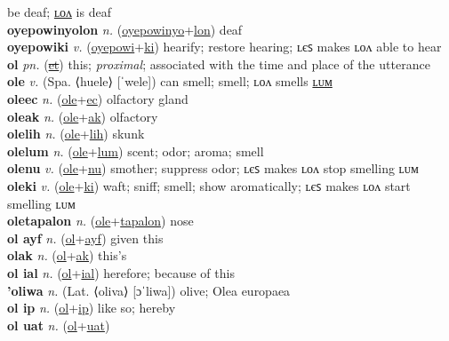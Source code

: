 be deaf; \hyperref[oyepowinyolon]{ʟᴏᴧ} is deaf \label{oyepowinyo} \\
\textbf{oyepowinyolon} \textit{n.} (\hyperref[oyepowinyo]{oyepowinyo}+\hyperref[lon]{lon})
deaf \label{oyepowinyolon} \\
\textbf{oyepowiki} \textit{v.} (\hyperref[oyepowi]{oyepowi}+\hyperref[ki]{ki})
hearify; restore hearing; ʟєꜱ makes ʟᴏᴧ able to hear \label{oyepowiki} \\
\textbf{ol} \textit{pn.} (\hyperref[et]{\sout{et}})
this; \textit{proximal}; associated with the time and place of the utterance \label{ol} \\
\textbf{ole} \textit{v.} (Spa. ⟨huele⟩ [ˈwele])
can smell; smell; ʟᴏᴧ smells \hyperref[olelum]{ʟᴜᴍ} \label{ole} \\
\textbf{oleec} \textit{n.} (\hyperref[ole]{ole}+\hyperref[ec]{ec})
olfactory gland \label{oleec} \\
\textbf{oleak} \textit{n.} (\hyperref[ole]{ole}+\hyperref[ak]{ak})
olfactory \label{oleak} \\
\textbf{olelih} \textit{n.} (\hyperref[ole]{ole}+\hyperref[lih]{lih})
skunk \label{olelih} \\
\textbf{olelum} \textit{n.} (\hyperref[ole]{ole}+\hyperref[lum]{lum})
scent; odor; aroma; smell \label{olelum} \\
\textbf{olenu} \textit{v.} (\hyperref[ole]{ole}+\hyperref[nu]{nu})
smother; suppress odor; ʟєꜱ makes ʟᴏᴧ stop smelling ʟᴜᴍ \label{olenu} \\
\textbf{oleki} \textit{v.} (\hyperref[ole]{ole}+\hyperref[ki]{ki})
waft; sniff; smell; show aromatically; ʟєꜱ makes ʟᴏᴧ start smelling ʟᴜᴍ \label{oleki} \\
\textbf{oletapalon} \textit{n.} (\hyperref[ole]{ole}+\hyperref[tapalon]{tapalon})
nose \label{oletapalon} \\
\textbf{ol ayf} \textit{n.} (\hyperref[ol]{ol}+\hyperref[ayf]{ayf})
given this \label{ol ayf} \\
\textbf{olak} \textit{n.} (\hyperref[ol]{ol}+\hyperref[ak]{ak})
this’s \label{olak} \\
\textbf{ol ial} \textit{n.} (\hyperref[ol]{ol}+\hyperref[ial]{ial})
herefore; because of this \label{ol ial} \\
\textbf{'oliwa} \textit{n.} (Lat. ⟨oliva⟩ [ɔˈliwa])
olive; Olea europaea \label{'oliwa} \\
\textbf{ol ip} \textit{n.} (\hyperref[ol]{ol}+\hyperref[ip]{ip})
like so; hereby \label{ol ip} \\
\textbf{ol uat} \textit{n.} (\hyperref[ol]{ol}+\hyperref[uat]{uat})
